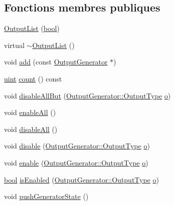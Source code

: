 \subsection*{Fonctions membres publiques}
\begin{DoxyCompactItemize}
\item 
\hyperlink{class_output_list_aa4820a09b009817bb03d3bbf883b7875}{Output\+List} (\hyperlink{qglobal_8h_a1062901a7428fdd9c7f180f5e01ea056}{bool})
\item 
virtual \hyperlink{class_output_list_aad71749c21aab2432b4fef32cf122b79}{$\sim$\+Output\+List} ()
\item 
void \hyperlink{class_output_list_a59f42f9a70314fbc4edd78d44f9d163d}{add} (const \hyperlink{class_output_generator}{Output\+Generator} $\ast$)
\item 
\hyperlink{qglobal_8h_a4d3943ddea65db7163a58e6c7e8df95a}{uint} \hyperlink{class_output_list_ac349b329d85bad7d55f01a777a288e40}{count} () const 
\item 
void \hyperlink{class_output_list_a73f9be626eea01f1ccd1b446dcf2c003}{disable\+All\+But} (\hyperlink{class_output_generator_ab79b5d3c19d95c8a5929c07f5b2918cf}{Output\+Generator\+::\+Output\+Type} \hyperlink{060__command__switch_8tcl_a495e7a4ede0831107e9d435080a7c268}{o})
\item 
void \hyperlink{class_output_list_ad32603ff4c4ba4d39e0bad7ede5924bf}{enable\+All} ()
\item 
void \hyperlink{class_output_list_a6a75284d21a037302ea3d7dc6e1558d4}{disable\+All} ()
\item 
void \hyperlink{class_output_list_a22f8c17b8c14518aa55f8af3c2abab0f}{disable} (\hyperlink{class_output_generator_ab79b5d3c19d95c8a5929c07f5b2918cf}{Output\+Generator\+::\+Output\+Type} \hyperlink{060__command__switch_8tcl_a495e7a4ede0831107e9d435080a7c268}{o})
\item 
void \hyperlink{class_output_list_a4006394472d6c49f7db435628832c49d}{enable} (\hyperlink{class_output_generator_ab79b5d3c19d95c8a5929c07f5b2918cf}{Output\+Generator\+::\+Output\+Type} \hyperlink{060__command__switch_8tcl_a495e7a4ede0831107e9d435080a7c268}{o})
\item 
\hyperlink{qglobal_8h_a1062901a7428fdd9c7f180f5e01ea056}{bool} \hyperlink{class_output_list_a63a7bebe83b904d00b2350863c7c7399}{is\+Enabled} (\hyperlink{class_output_generator_ab79b5d3c19d95c8a5929c07f5b2918cf}{Output\+Generator\+::\+Output\+Type} \hyperlink{060__command__switch_8tcl_a495e7a4ede0831107e9d435080a7c268}{o})
\item 
void \hyperlink{class_output_list_a885957a64f7d87aefb663c4ec903188f}{push\+Generator\+State} ()

\end{DoxyCompactItemize}
